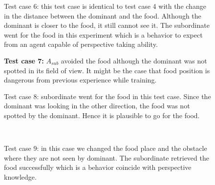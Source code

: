 \documentclass{article}
\begin{document}
\begin{figure}[H]
\begin{center}
\caption{Test  case 6: this test case is identical to test case 4 with the change in the distance between the dominant and the food. Although the dominant is closer to the food, it still cannot see it. The subordinate went for the food in this experiment which is a behavior to expect from an agent capable of perspective taking ability.}
\label{fig.tc.6}
\end{center}
\end{figure}



\begin{figure}[H]
\begin{center}
\caption{\textbf {Test  case 7:} \(A_{sub}\) avoided the food although the dominant was not spotted in its field of view. It might be the case that food position is dangerous from previous experience while training.}
\label{fig.tc.7}
\end{center}
\end{figure}
\begin{figure}[H]
\begin{center}
\caption{Test  case 8: subordinate went for the food in this test case. Since the dominant was looking in the other direction, the food was not spotted by the dominant. Hence it is plausible to go for the food.  }
\label{fig.tc.8}
\end{center}
\end{figure}
\begin{figure}[H]
\begin{center}
\\
\caption{Test  case 9: in this case we changed the food place and the obstacle where they are not seen by dominant. The subordinate retrieved the food successfully which is a behavior coincide with perspective knowledge.} 
\label{fig.tc.9}
\end{center}
\end{figure}
\end{document}
